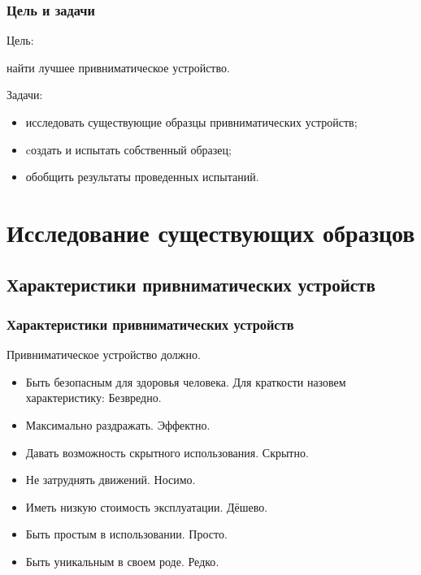     
\begin{frame}
    \frametitle{Цель и задачи}
    
    \begin{block}{Цель:}
        \begin{center}
            найти \alert{лучшее} привниматическое устройство.
        \end{center}
    \end{block}
    
    \par\bigskip
    
    \begin{block}{Задачи:}
        \begin{itemize}
            \item исследовать существующие образцы привниматических устройств; 
            \item cоздать и испытать собственный образец;
            \item обобщить результаты проведенных испытаний.
        \end{itemize}
    \end{block}
\end{frame}


\section{Исследование существующих образцов}

\subsection{Характеристики привниматических устройств}

\begin{frame}
    \frametitle{Характеристики привниматических устройств}
    
    Привниматическое устройство должно.
    \begin{itemize}
        \item Быть безопасным для здоровья человека. Для краткости назовем характеристику: \alert{Безвредно}.
        
        \item Максимально раздражать. \alert{Эффектно}.  
        
        \item Давать возможность скрытного использования. \alert{Скрытно}.  
        
        \item Не затруднять движений. \alert{Носимо}.
        
        \item Иметь низкую стоимость эксплуатации. \alert{Дёшево}. 
        
        \item Быть простым в использовании. \alert{Просто}.

        \item Быть уникальным в своем роде. \alert{Редко}.
    \end{itemize}
\end{frame}

